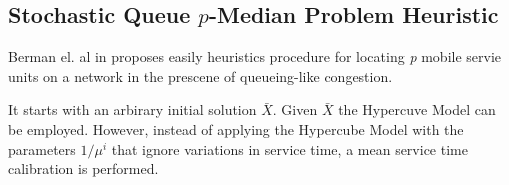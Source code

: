
\subsection{Stochastic Queue $p$-Median Problem Heuristic}
\begin{frame}
Berman el. al in \cite{berman1987stochastic} proposes easily heuristics procedure 
for locating \textit{p} mobile servie units on a network in the prescene of queueing-like congestion.

It starts with an arbirary initial solution $\bar{X}$.
Given $\bar{X}$ the Hypercuve Model can be employed.
However, instead of applying the Hypercube Model with the parameters $1/\mu^i$ that ignore variations in service time,
a mean service time calibration is performed.  
\end{frame}

